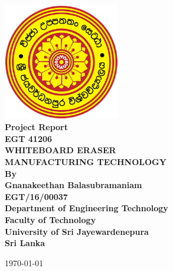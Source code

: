 \documentclass[12pt,a4paper,oneside]{article}
\begin{document}
\begin{titlepage}

\begin{flushright}
\end{flushright}


\center %
{
\includegraphics[width=2in,keepaspectratio]{logo.png}\\[0.5cm]
\fontsize{16pt}{24}\selectfont \textbf{Project Report}\\[0.5cm]
\fontsize{16pt}{24}\selectfont \textbf{EGT 41206}\\[0.75cm]
\fontsize{24pt}{30}\selectfont \textbf{\uppercase{Whiteboard Eraser}}\\[1.5cm]
\fontsize{16}{24}\selectfont \textbf{\uppercase{Manufacturing Technology}}\\[1.5cm]
\fontsize{16pt}{24}\selectfont \textbf{By}\\[0.5cm]
\fontsize{12pt}{12}\selectfont {
}
\vspace*{\fill}
\fontsize{12pt}{12}\selectfont \textbf { Gnanakeethan Balasubramaniam \\ EGT/16/00037}\\[0.5cm]


\vspace*{\fill}
\fontsize{12pt}{12}\selectfont \textbf {Department of Engineering Technology \\ Faculty of Technology\\University of Sri Jayewardenepura\\ Sri Lanka \\ }
\vspace*{\fill}

\today
}


\end{titlepage}
\end{document}
